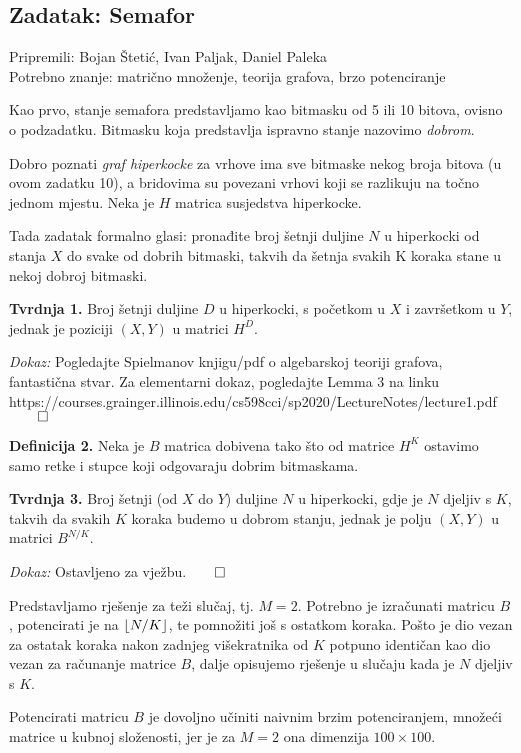 \subsection*{Zadatak: Semafor}
\textsf{Pripremili: Bojan Štetić, Ivan Paljak, Daniel Paleka}\\
\textsf{Potrebno znanje: matrično množenje, teorija grafova, brzo potenciranje}

Kao prvo, stanje semafora predstavljamo kao bitmasku od 5 ili 10 bitova, ovisno
o podzadatku. Bitmasku koja predstavlja ispravno stanje nazovimo
\textit{dobrom}.

Dobro poznati \textit{graf hiperkocke} za vrhove ima sve bitmaske nekog
broja bitova (u ovom zadatku 10), a bridovima su povezani vrhovi koji se
razlikuju na točno jednom mjestu. Neka je $H$ matrica susjedstva hiperkocke.

Tada zadatak formalno glasi: pronađite broj šetnji duljine $N$ u hiperkocki
od stanja $X$ do svake od dobrih bitmaski, takvih da šetnja svakih K koraka
stane u nekoj dobroj bitmaski.

\textbf{Tvrdnja 1.} Broj šetnji duljine $D$ u hiperkocki, s početkom u $X$
i završetkom u $Y$, jednak je poziciji $(X, Y)$ u matrici $H^D$.

\textit{Dokaz:} Pogledajte Spielmanov knjigu/pdf o algebarskoj teoriji grafova,
fantastična stvar. Za elementarni dokaz, pogledajte Lemma 3 na linku
\\
{https://courses.grainger.illinois.edu/cs598cci/sp2020/LectureNotes/lecture1.pdf}
$\qed$

\textbf{Definicija 2.} Neka je $B$ matrica dobivena tako što od matrice $H^K$
ostavimo samo retke i stupce koji odgovaraju dobrim bitmaskama.

\textbf{Tvrdnja 3.} Broj šetnji (od $X$ do $Y$) duljine $N$ u hiperkocki, gdje
je $N$ djeljiv s $K$, takvih da svakih $K$ koraka budemo u dobrom stanju,
jednak je polju $(X, Y)$ u matrici $B^{N/K}$.

\textit{Dokaz:} Ostavljeno za vježbu.$\qed$

Predstavljamo rješenje za teži slučaj, tj. $M=2$.
Potrebno je izračunati matricu $B$, potencirati je na $\lfloor N/K\rfloor$, te
pomnožiti još s ostatkom koraka. Pošto je dio vezan za ostatak koraka
nakon zadnjeg višekratnika od $K$ potpuno identičan kao
dio vezan za računanje matrice $B$, dalje opisujemo rješenje
u slučaju kada je $N$ djeljiv s $K$.

Potencirati matricu $B$ je dovoljno učiniti naivnim brzim potenciranjem,
množeći matrice u kubnoj složenosti, jer je za $M=2$ ona dimenzija $100 \times
100$.


